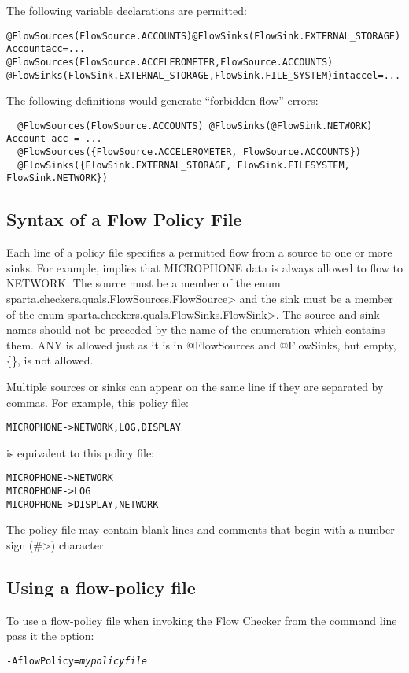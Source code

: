 The following variable declarations are permitted:
\begin{alltt}
  @FlowSources(FlowSource.ACCOUNTS) @FlowSinks(FlowSink.EXTERNAL_STORAGE) Account acc = ...
  @FlowSources({FlowSource.ACCELEROMETER, FlowSource.ACCOUNTS})
  @FlowSinks({FlowSink.EXTERNAL_STORAGE, FlowSink.FILE_SYSTEM}) int accel = ...
\end{alltt}

The following definitions would generate ``forbidden flow'' errors:
\begin{Verbatim}
  @FlowSources(FlowSource.ACCOUNTS) @FlowSinks(@FlowSink.NETWORK) Account acc = ...
  @FlowSources({FlowSource.ACCELEROMETER, FlowSource.ACCOUNTS})
  @FlowSinks({FlowSink.EXTERNAL_STORAGE, FlowSink.FILESYSTEM, FlowSink.NETWORK})
\end{Verbatim}


\subsection{Syntax of a Flow Policy File}

Each line of a policy file specifies a permitted flow from a source to one
or more sinks.  For example,
 implies that
MICROPHONE data is always allowed to flow to NETWORK.
The source must be a member of the enum
\<sparta.checkers.quals.FlowSources.FlowSource> and the sink must be a
member of the enum 
\<sparta.checkers.quals.FlowSinks.FlowSink>.  The source 
and sink names should not be preceded by the name of the enumeration which contains them.
ANY is allowed just as it is in @FlowSources and @FlowSinks, but empty, \{\}, is not allowed.

Multiple sources or sinks can appear on the same line if they are separated by commas. 
For example,
this policy file:
\begin{alltt}
   MICROPHONE -> NETWORK, LOG, DISPLAY
\end{alltt}
is equivalent to this policy file:
\begin{alltt}
   MICROPHONE -> NETWORK
   MICROPHONE -> LOG
   MICROPHONE -> DISPLAY, NETWORK
\end{alltt}

The policy file may contain blank lines and comments that begin with 
a number sign (\<\#>) character.



\subsection{Using a flow-policy file}
To use a flow-policy file when invoking the Flow Checker from the
command line pass it the option:
\begin{alltt}
-AflowPolicy=\emph{mypolicyfile}
\end{alltt}

